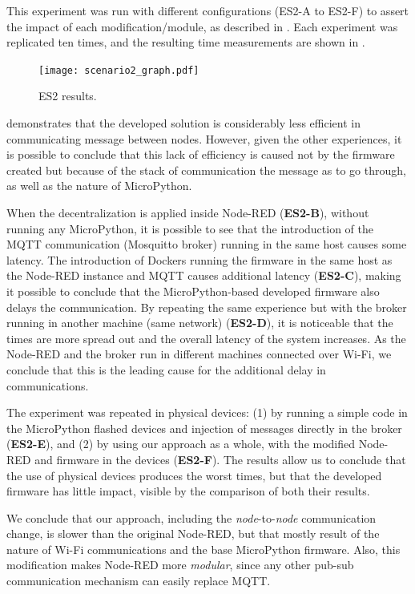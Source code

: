 This experiment was run with different configurations (ES2-A to ES2-F) to assert the impact of each modification/module, as described in . Each experiment was replicated ten times, and the resulting time measurements are shown in .

\begin{figure}[h]
\centering
\texttt{[image: scenario2\_graph.pdf]}
\caption[ES2 results.]{ES2 results.}\label{fig:scenario2_candlestick}
\end{figure}

 demonstrates that the developed solution is considerably less efficient in communicating message between nodes. However, given the other experiences, it is possible to conclude that this lack of efficiency is caused not by the firmware created but because of the stack of communication the message as to go through, as well as the nature of MicroPython. 

When the decentralization is applied inside Node-RED (\cf \textbf{ES2-B}), without running any MicroPython, it is possible to see that the introduction of the MQTT communication (Mosquitto broker) running in the same host causes some latency. The introduction of Dockers running the firmware in the same host as the Node-RED instance and MQTT causes additional latency (\cf \textbf{ES2-C}), making it possible to conclude that the MicroPython-based developed firmware also delays the communication. By repeating the same experience but with the broker running in another machine (same network) (\cf \textbf{ES2-D}), it is noticeable that the times are more spread out and the overall latency of the system increases. As the Node-RED and the broker run in different machines connected over Wi-Fi, we conclude that this is the leading cause for the additional delay in communications.

The experiment was repeated in physical devices: (1) by running a simple code in the MicroPython flashed devices and injection of messages directly in the broker (\cf \textbf{ES2-E}), and (2) by using our approach as a whole, with the modified Node-RED and firmware in the devices (\cf \textbf{ES2-F}). The results allow us to conclude that the use of physical devices produces the worst times, but that the developed firmware has little impact, visible by the comparison of both their results.

We conclude that our approach, including the \textit{node}-to-\textit{node} communication change, is slower than the original Node-RED, but that mostly result of the nature of Wi-Fi communications and the base MicroPython firmware. Also, this modification makes Node-RED more \textit{modular}, since any other pub-sub communication mechanism can easily replace MQTT.

